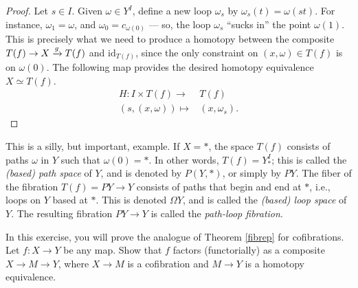 \begin{proof}
	Let $s\in I$. Given $\omega \in Y^I$, define a new loop $\omega_s$ by $\omega_s(t) = \omega(st)$.
	For instance, $\omega_1 = \omega$, and $\omega_0 = c_{\omega(0)}$ --- so, the loop $\omega_s$ ``sucks in''
	the point $\omega(1)$.
	This is precisely what we need to produce a homotopy between the composite $T(f) \to X \xrightarrow{{g}} T(f)$ and
	$\mathrm{id}_{T(f)}$, since the only constraint on $(x,\omega)\in T(f)$ is on $\omega(0)$.
	The following map provides the desired homotopy equivalence $X \simeq T(f)$.
	\begin{align*}
	    H:I\times T(f)\to & T(f)\\
	    (s,(x,\omega))\mapsto & (x,\omega_s).
	\end{align*}
\end{proof}

\begin{example}
    This is a silly, but important, example.
    If $X = \ast$, the space $T(f)$ consists of paths $\omega$ in $Y$ such that $\omega(0) = \ast$.
    In other words, $T(f) = Y^I_\ast$; this is called the \emph{(based) path space} of $Y$, and is denoted by $P(Y,\ast)$,
    or simply by $PY$.
    The fiber of the fibration $T(f) = PY \to Y$ consists of paths that begin and end at $\ast$, i.e., 
    loops on $Y$ based at $\ast$.
    This is denoted $\Omega Y$, and is called the \emph{(based) loop space} of $Y$.
    The resulting fibration $PY \to Y$ is called the \emph{path-loop fibration}.
\end{example}

\begin{exercise}
    In this exercise, you will prove the analogue of Theorem \ref{fibrep} for cofibrations.
    Let $f:X\to Y$ be any map.
    Show that $f$ factors (functorially) as a composite $X \to M \to Y$, where $X\to M$ is a cofibration and $M\to Y$ is a homotopy
    equivalence.
\end{exercise}

